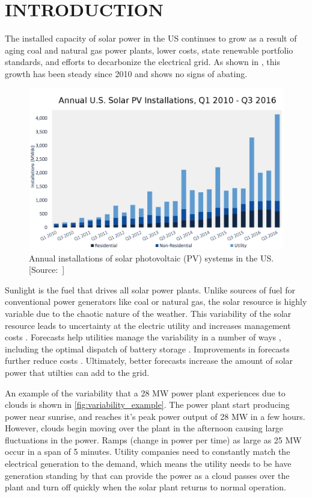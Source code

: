 \chapter{INTRODUCTION}
\label{chap:intro}

The installed capacity of solar power in the US continues to grow as a
result of aging coal and natural gas power plants, lower costs,
state renewable portfolio standards, and efforts to decarbonize the
electrical grid.
As shown in , this growth has been steady since
2010 and shows no signs of abating.

\begin{figure}[htb]
  \includegraphics[width=\textwidth]{figs/solar_installations.png}
  \caption[Annual installations of solar PV in the US]{Annual
    installations of solar photovoltaic (PV) systems in the
    US. [Source:~\cite{GTM/SEIA2016}]}
\label{fig:solarinstall}
\end{figure}

Sunlight is the fuel that drives all solar power plants.
Unlike sources of fuel for conventional power generators like coal or
natural gas, the solar resource is highly variable due to the chaotic
nature of the weather.
This variability of the solar resource leads to uncertainty at the
electric utility and increases management costs \citep{Joskow2011}.
Forecasts help utilities manage the variability in a number of ways
\citep{Kleissl2013,Inman2013}, including the optimal dispatch of
battery storage \citep{Cormode2015}.
Improvements in forecasts further reduce costs
\citep{BrancucciMartinez-Anido2016}.
Ultimately, better forecasts increase the amount of solar power that
utilties can add to the grid.

An example of the variability that a 28 MW power plant experiences due
to clouds is shown in \cref{fig:variability_example}.
The power plant start producing power near sunrise, and reaches it's
peak power output of 28 MW in a few hours.
However, clouds begin moving over the plant in the afternoon causing
large fluctuations in the power.
Ramps (change in power per time) as large as 25 MW occur in a span of
5 minutes.
Utility companies need to constantly match the electrical generation
to the demand, which means the utility needs to be have generation
standing by that can provide the power as a cloud passes over the
plant and turn off quickly when the solar plant returns to normal
operation.


